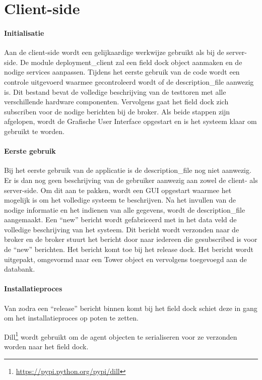 \section{Client-side}
\paragraph{Initialisatie}
Aan de client-side wordt een gelijkaardige werkwijze gebruikt als bij de server-side.
De module deployment\_client zal een field dock object aanmaken en de nodige services aanpassen.
Tijdens het eerste gebruik van de code wordt een controle uitgevoerd waarmee gecontroleerd wordt of de description\_file aanwezig is.
Dit bestand bevat de volledige beschrijving van de testtoren met alle verschillende hardware componenten.
Vervolgens gaat het field dock zich subscriben voor de nodige berichten bij de broker.
Als beide stappen zijn afgelopen, wordt de Grafische User Interface opgestart en is het systeem klaar om gebruikt te worden.

\paragraph{Eerste gebruik}
Bij het eerste gebruik van de applicatie is de description\_file nog niet aanwezig.
Er is dan nog geen beschrijving van de gebruiker aanwezig aan zowel de client- als server-side.
Om dit aan te pakken, wordt een GUI opgestart waarmee het mogelijk is om het volledige systeem te beschrijven.
Na het invullen van de nodige informatie en het indienen van alle gegevens, wordt de description\_file aangemaakt.
Een ``new'' bericht wordt gefabriceerd met in het data veld de volledige beschrijving van het systeem.
Dit bericht wordt verzonden naar de broker en de broker stuurt het bericht door naar iedereen die gesubscribed is voor de ``new'' berichten.
Het bericht komt toe bij het release dock.
Het bericht wordt uitgepakt, omgevormd naar een Tower object en vervolgens toegevoegd aan de databank.

\paragraph{Installatieproces}
Van zodra een ``release'' bericht binnen komt bij het field dock schiet deze in gang om het installatieproces op poten te zetten.

Dill\footnote{\url{https://pypi.python.org/pypi/dill}} wordt gebruikt om de agent objecten te serialiseren voor ze verzonden worden naar het field dock.


